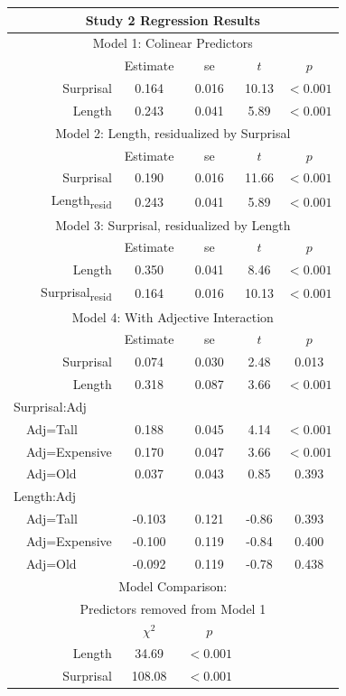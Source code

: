 \noindent
\footnotesize{
\begin{tabular}{r|cccc}
\hline
\hline
\multicolumn{5}{c}{\textbf{Study 2 Regression Results}} \\
\hline
\hline
\multicolumn{5}{c}{Model 1: Colinear Predictors} \\
& Estimate & se & $t$ & $p$ \\
\hline
Surprisal & 0.164 & 0.016 & 10.13 & $<0.001$ \\
Length & 0.243 & 0.041 & 5.89 & $<0.001$ \\
\hline
\hline
\multicolumn{5}{c}{Model 2: Length, residualized by Surprisal} \\
& Estimate & se & $t$ & $p$ \\
\hline
Surprisal & 0.190 & 0.016 & 11.66 & $<0.001$ \\
Length\textsubscript{resid} & 0.243 & 0.041 & 5.89 & $<0.001$ \\
\hline
\hline
\multicolumn{5}{c}{Model 3: Surprisal, residualized by Length} \\
& Estimate & se & $t$ & $p$ \\
\hline
Length & 0.350 & 0.041 & 8.46 & $<0.001$ \\
Surprisal\textsubscript{resid} & 0.164 & 0.016 & 10.13 & $<0.001$ \\
\hline
\hline
\multicolumn{5}{c}{Model 4: With Adjective Interaction} \\
& Estimate & se & $t$ & $p$ \\
\hline
Surprisal & 0.074 & 0.030 & 2.48 & 0.013 \\
Length & 0.318 & 0.087 & 3.66 & $<0.001$ \\
\multicolumn{1}{l|}{Surprisal:Adj} & & & & \\
\multicolumn{1}{l|}{\ \ Adj=Tall} & 0.188 & 0.045 & 4.14 & $<0.001$ \\
\multicolumn{1}{l|}{\ \ Adj=Expensive} & 0.170 & 0.047 & 3.66 & $<0.001$ \\
\multicolumn{1}{l|}{\ \ Adj=Old} & 0.037 & 0.043 & 0.85 & 0.393 \\
\multicolumn{1}{l|}{Length:Adj} & & & & \\
\multicolumn{1}{l|}{\ \ Adj=Tall} & -0.103 & 0.121 & -0.86 & 0.393 \\
\multicolumn{1}{l|}{\ \ Adj=Expensive} & -0.100 & 0.119 & -0.84 & 0.400 \\
\multicolumn{1}{l|}{\ \ Adj=Old} & -0.092 & 0.119 & -0.78 & 0.438 \\
\hline
\hline
\multicolumn{5}{c}{Model Comparison:} \\
\multicolumn{5}{c}{Predictors removed from Model 1} \\
& $\chi^2$ & $p$ \\
\hline
Length & 34.69 & $<0.001$ \\
Surprisal & 108.08 & $<0.001$ \\
\hline
\hline
\end{tabular}
}



